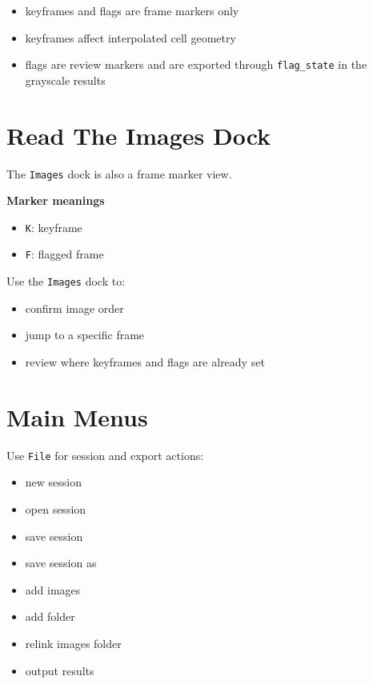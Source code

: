 \documentclass[
  9pt,
  letterpaper,
  oneside,
  open=any,
  DIV=15,
  parskip=half-,
  headings=big,
  numbers=noenddot
]{scrbook}
\newcommand{\manuallead}[1]{%
  \vspace{0.15em}%
  {\sffamily\bfseries\color{ManualBlue}#1}\par\nobreak\vspace{0.05em}%
}
\begin{document}
\begin{itemize}[leftmargin=*,itemsep=0.35em,topsep=0.4em]
\item keyframes and flags are frame markers only
\item keyframes affect interpolated cell geometry
\item flags are review markers and are exported through \texttt{flag\_state} in the grayscale results
\end{itemize}

\section{Read The Images Dock}

The \texttt{Images} dock is also a frame marker view.


\manuallead{Marker meanings}

\begin{itemize}[leftmargin=*,itemsep=0.35em,topsep=0.4em]
\item \texttt{K}: keyframe
\item \texttt{F}: flagged frame
\end{itemize}

Use the \texttt{Images} dock to:


\begin{itemize}[leftmargin=*,itemsep=0.35em,topsep=0.4em]
\item confirm image order
\item jump to a specific frame
\item review where keyframes and flags are already set
\end{itemize}

\section{Main Menus}

Use \texttt{File} for session and export actions:


\begin{itemize}[leftmargin=*,itemsep=0.35em,topsep=0.4em]
\item new session
\item open session
\item save session
\item save session as
\item add images
\item add folder
\item relink images folder
\item output results
\end{itemize}
\end{document}
